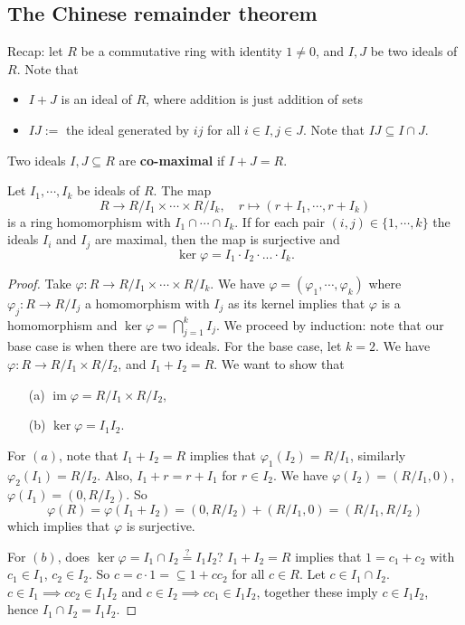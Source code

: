 \subsection{The Chinese remainder theorem}
Recap: let $R$ be a commutative ring with identity $1\neq 0$, and $I,J$ be two ideals of $R$. Note that 
\begin{itemize}
    \item $I+J$ is an ideal of $R$, where addition is just addition of sets
    \item $IJ:=$ the ideal generated by $ij$ for all $i\in I,j\in J$. Note that $IJ\subseteq I\cap J$. 
\end{itemize}
\begin{definition}[Co-maximality]
    Two ideals $I,J\subseteq R$ are \textbf{co-maximal} if $I+J=R$. 
\end{definition}
\begin{theorem}
Let $I_1,\cdots ,I_k$ be ideals of $R$. The map \[
    R\to R/ I_1 \times \cdots \times R /I_k, \quad r\mapsto (r+I_1,\cdots ,r+I_k)
\] is a ring homomorphism with $I_1\cap \cdots \cap I_k$. If for each pair $(i,j)\in \{1,\cdots ,k\} $ the ideals $I_i $ and $I_j $ are maximal, then the map is surjective and \[
\ker \varphi =I_1\cdot I_2\cdot  ...\cdot I_k.
\] 
\end{theorem}
\begin{proof}
    Take $\varphi \colon R \to R /I_1 \times  \cdots \times  R /I_k$. We have $\varphi =(\varphi_1 ,\cdots , \varphi_k )$ where $\varphi _j  \colon R \to R /I_j $ a homomorphism with $I_j $ as its kernel implies that $\varphi $ is a homomorphism and $\ker \varphi =\bigcap_{j=1} ^k I_j $. We proceed by induction: note that our base case is when there are two ideals. For the base case, let $k=2$. We have $\varphi \colon R \to R /I_1\times R /I_2 $, and $I_1+I_2=R$. We want to show that
    \begin{enumerate}
    \item[(a)] $\operatorname{im}\varphi =R /I_1\times R /I_2$,
    \item[(b)] $\ker \varphi =I_1I_2$.
    \end{enumerate}
    For $(a)$, note that $I_1+I_2=R$ implies that $\varphi_1 (I_2)=R /I_1$, similarly $\varphi_2(I_1)=R /I_2 $. Also, $I_1+r=r+I_1$ for $r\in I_2$. We have $\varphi (I_2)= (R /I_1,0)$, $\varphi (I_1)=(0, R/I_2)$. So \[
        \varphi (R)=\varphi (I_1+I_2)=(0,R/I_2)+(R /I_1,0)=(R /I_1, R /I_2)
    \] which implies that $\varphi $ is surjective.

    For $(b)$, does $\ker \varphi =I_1\cap I_2\overset{?}{=}I_1I_2$? $I_1+I_2=R$ implies that $1=c_1+c_2$ with $c_1\in I_1 $, $c_2\in I_2$. So $c=c\cdot 1=\subseteq 1+cc_2$ for all $c\in R$. Let $c\in I_1\cap I_2$. $c\in I_1\implies c c_2\in I_1I_2$ and $c\in I_2\implies cc_1\in I_1I_2$, together these imply $c\in I_1I_2$, hence $I_1\cap I_2=I_1I_2$.
\end{proof}


